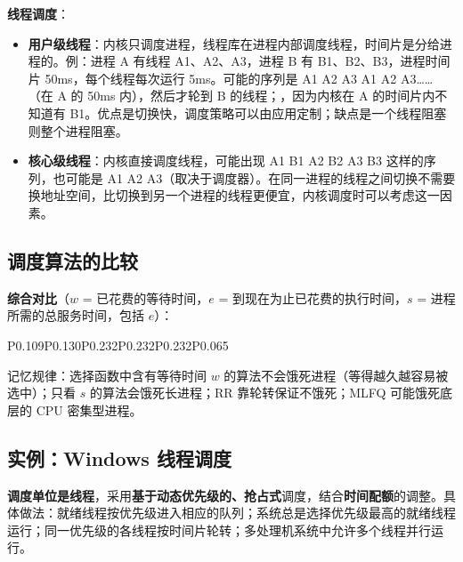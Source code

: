 \textbf{线程调度}：
\begin{itemize}
    \item \textbf{用户级线程}：内核只调度进程，线程库在进程内部调度线程，时间片是分给进程的。例：进程 A 有线程 A1、A2、A3，进程 B 有 B1、B2、B3，进程时间片 50ms，每个线程每次运行 5ms。可能的序列是 A1 A2 A3 A1 A2 A3……（在 A 的 50ms 内），然后才轮到 B 的线程；，因为内核在 A 的时间片内不知道有 B1。优点是切换快，调度策略可以由应用定制；缺点是一个线程阻塞则整个进程阻塞。
    \item \textbf{核心级线程}：内核直接调度线程，可能出现 A1 B1 A2 B2 A3 B3 这样的序列，也可能是 A1 A2 A3（取决于调度器）。在同一进程的线程之间切换不需要换地址空间，比切换到另一个进程的线程更便宜，内核调度时可以考虑这一因素。
\end{itemize}

\subsection{调度算法的比较}

\textbf{综合对比}（$w$ = 已花费的等待时间，$e$ = 到现在为止已花费的执行时间，$s$ = 进程所需的总服务时间，包括 $e$）：\par
\begin{btab}{P{0.109}P{0.130}P{0.232}P{0.232}P{0.232}P{0.065}}
\end{btab}
记忆规律：选择函数中含有等待时间 $w$ 的算法不会饿死进程（等得越久越容易被选中）；只看 $s$ 的算法会饿死长进程；RR 靠轮转保证不饿死；MLFQ 可能饿死底层的 CPU 密集型进程。

\subsection{实例：Windows 线程调度}

\textbf{调度单位是线程}，采用\textbf{基于动态优先级的、抢占式}调度，结合\textbf{时间配额}的调整。具体做法：就绪线程按优先级进入相应的队列；系统总是选择优先级最高的就绪线程运行；同一优先级的各线程按时间片轮转；多处理机系统中允许多个线程并行运行。


